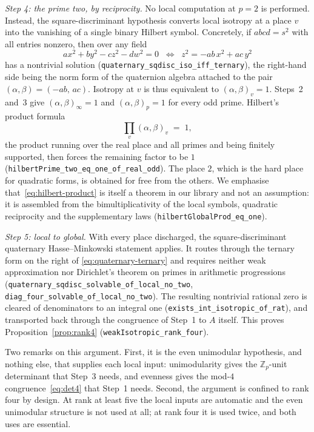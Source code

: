 \emph{Step 4: the prime two, by reciprocity.} No local computation at
$p = 2$ is performed. Instead, the square-discriminant hypothesis
converts local isotropy at a place $v$ into the vanishing of a single
binary Hilbert symbol. Concretely, if $abcd = s^2$ with all entries
nonzero, then over any field
\begin{equation}
a x^2 + b y^2 - c z^2 - d w^2 = 0
\;\;\Longleftrightarrow\;\;
z^2 = -ab\,x^2 + ac\,y^2
\label{eq:quaternary-ternary}
\end{equation}
has a nontrivial solution (\texttt{quaternary\_sqdisc\_iso\_iff\_ternary}),
the right-hand side being the norm form of the quaternion algebra attached
to the pair $(\alpha,\beta) = (-ab,\,ac)$. Isotropy at $v$ is thus
equivalent to $(\alpha,\beta)_v = 1$. Steps~2 and~3 give
$(\alpha,\beta)_\infty = 1$ and $(\alpha,\beta)_p = 1$ for every odd
prime. Hilbert's product formula
\begin{equation}
\prod_{v} \left(\alpha,\beta\right)_v \;=\; 1 ,
\label{eq:hilbert-product}
\end{equation}
the product running over the real place and all primes and being finitely
supported, then forces the remaining factor to be $1$
(\texttt{hilbertPrime\_two\_eq\_one\_of\_real\_odd}). The place $2$, which
is the hard place for quadratic forms, is obtained for free from the
others. We emphasise that~\eqref{eq:hilbert-product} is itself a theorem
in our library and not an assumption: it is assembled from the
bimultiplicativity of the local symbols, quadratic reciprocity and the
supplementary laws (\texttt{hilbertGlobalProd\_eq\_one}).

\emph{Step 5: local to global.} With every place discharged, the
square-discriminant quaternary Hasse--Minkowski statement applies. It
routes through the ternary form on the right of
\eqref{eq:quaternary-ternary} and requires neither weak approximation nor
Dirichlet's theorem on primes in arithmetic progressions
(\texttt{quaternary\_sqdisc\_solvable\_of\_local\_no\_two},
\texttt{diag\_four\_solvable\_of\_local\_no\_two}). The resulting
nontrivial rational zero is cleared of denominators to an integral one
(\texttt{exists\_int\_isotropic\_of\_rat}), and transported back through
the congruence of Step~1 to $A$ itself. This proves
Proposition~\ref{prop:rank4} (\texttt{weakIsotropic\_rank\_four}).

Two remarks on this argument. First, it is the even unimodular hypothesis,
and nothing else, that supplies each local input: unimodularity gives the
$\mathbb{Z}_p$-unit determinant that Step~3 needs, and evenness gives
the mod-$4$ congruence~\eqref{eq:det4} that Step~1 needs. Second, the
argument is confined to rank four by design. At rank at least five the
local inputs are automatic and the even unimodular structure is not used
at all; at rank four it is used twice, and both uses are essential.

